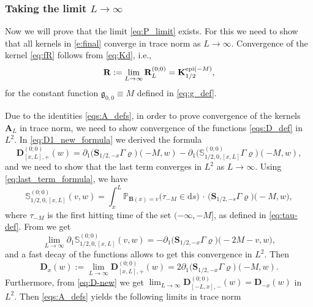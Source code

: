 \documentclass[oneside,final,11pt]{amsart}
\theoremstyle{definition}
\newcommand{\fg}{\mathfrak{g}}
\renewcommand{\d}{\mathrm{d}}
\renewcommand{\SS}{\mathbb{S}}
\newcommand{\1}[1]{\mathbf{1}_{#1}}
\newcommand{\uptext}[1]{\text{\upshape{#1}}}
\DeclareMathOperator{\epi}{\uptext{epi}}
\newcommand{\fT}{\mathbf{S}}
\newcommand{\fx}{x}
\newcommand{\fM}{M}
\newcommand{\fD}{\mathbf{D}}
\newcommand{\fB}{\mathbf{B}}
\newcommand{\fA}{\mathbf{A}}
\newcommand{\fK}{\mathbf{K}}
\newcommand{\fR}{\mathbf{R}}
\renewcommand{\P}{\mathbb P}
\numberwithin{equation}{section}
\begin{document}
\subsubsection{Taking the limit $L \to \infty$}
\label{sec:L-to-infinity}

Now we will prove that the limit \eqref{eq:P_limit} exists. For this we need to show that all kernels in \eqref{e:final} converge in trace norm as $L \to \infty$. Convergence of the kernel \eqref{eq:fR} follows from \eqref{eq:Kd}, i.e., 
\begin{equation}\label{eq:R-limit}
\fR := \lim_{L \to \infty} \fR_L^{(0; 0)} = \fK^{\epi(-\fM)}_{1/2},
\end{equation}
for the constant function $\fg_{0, 0} \equiv \fM$ defined in \eqref{eq:g_def}. 

Due to the identities \eqref{eqs:A_defs}, in order to prove convergence of the kernels $\fA_L$ in trace norm, we need to show convergence of the functions \eqref{eqs:D_def} in $L^2$. In \eqref{eq:D1_new_formula} we derived the formula 
\begin{equation}
\fD^{(0; 0)}_{[\fx, L], +}(w) = \partial_{1} \bigl(\fT_{1/2,-\fx} \Gamma \varrho\bigr) (-\fM, w) - \partial_{1} \bigl( \SS_{1/2, 0, [\fx, L]}^{(0; 0)} \Gamma \varrho\bigr) (-\fM, w),
\end{equation}
and we need to show that the last term converges in $L^2$ as $L \to \infty$. Using \eqref{eq:last_term_formula}, we have 
\begin{equation}
\SS_{1/2, 0, [\fx, L]}^{(0; 0)} (v, w) = \int_\fx^{L} \P_{\fB(\fx)=v} \bigl( \tau_{-\fM} \in \d s\bigr) \,\cdot\, \bigl( \fT_{1/2, - s} \Gamma \varrho \bigr) \bigl(-\fM, w\bigr),
\end{equation}
where $\tau_{-\fM}$ is the first hitting time of the set $(-\infty, -\fM]$, as defined in \eqref{eq:tau-def}. From \cite[Proposition~3.7]{flat} we get 
\begin{equation}
\lim_{L \to \infty} \partial_{1} \SS_{1/2, 0, [\fx, L]}^{(0; 0)} (v, w) = - \partial_{1} \bigl( \fT_{1/2, - \fx} \Gamma \varrho \bigr) \bigl(-2\fM - v, w\bigr),
\end{equation}
and a fast decay of the functions allows to get this convergence in $L^2$. Then
\begin{equation}\label{eq:D-limit}
\fD_{x}(w) := \lim_{L \to \infty} \fD^{(0; 0)}_{[\fx, L], +}(w) = 2 \partial_{1} \bigl(\fT_{1/2,-\fx} \Gamma \varrho\bigr) (-\fM, w).
\end{equation}
Furthermore, from \eqref{eq:D-new} we get $\lim_{L \to \infty} \fD^{(0; 0)}_{[-L, \fx], -}(w) = \fD_{-x}(w)$ in $L^2$. Then \eqref{eqs:A_defs} yields the following limits in trace norm
\end{document}
